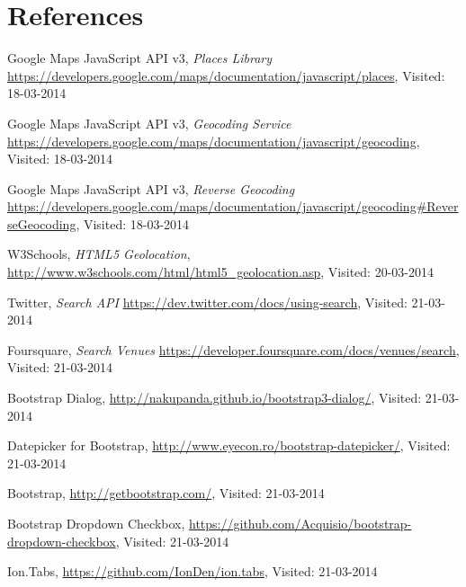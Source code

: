 \section*{References}

\begingroup
\renewcommand{\section}[2]{}%

\begin{thebibliography}{99}

	Google Maps JavaScript API v3,
    \emph{Places Library}
    \url{https://developers.google.com/maps/documentation/javascript/places},
    Visited: 18-03-2014
    
	Google Maps JavaScript API v3,
    \emph{Geocoding Service}
    \url{https://developers.google.com/maps/documentation/javascript/geocoding},
    Visited: 18-03-2014

	Google Maps JavaScript API v3,
    \emph{Reverse Geocoding}
    \url{https://developers.google.com/maps/documentation/javascript/geocoding#ReverseGeocoding},
    Visited: 18-03-2014

	W3Schools, 
	\emph{HTML5 Geolocation},
    \url{http://www.w3schools.com/html/html5_geolocation.asp}, Visited: 20-03-2014
    
	Twitter,
    \emph{Search API}
    \url{https://dev.twitter.com/docs/using-search},
    Visited: 21-03-2014
    
	Foursquare,
    \emph{Search Venues}
    \url{https://developer.foursquare.com/docs/venues/search},
    Visited: 21-03-2014
    
	Bootstrap Dialog,
    \url{http://nakupanda.github.io/bootstrap3-dialog/},
    Visited: 21-03-2014
    
	Datepicker for Bootstrap,
    \url{http://www.eyecon.ro/bootstrap-datepicker/},
    Visited: 21-03-2014
    
	Bootstrap,
    \url{http://getbootstrap.com/},
    Visited: 21-03-2014
    
	Bootstrap Dropdown Checkbox,
    \url{https://github.com/Acquisio/bootstrap-dropdown-checkbox},
    Visited: 21-03-2014
    
	Ion.Tabs,
    \url{https://github.com/IonDen/ion.tabs},
    Visited: 21-03-2014
    

\end{thebibliography}
